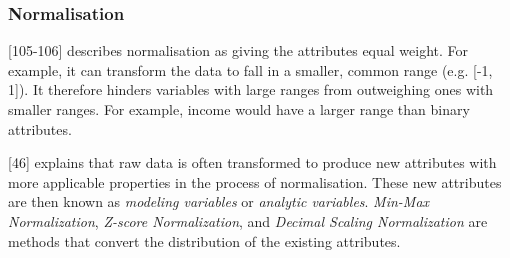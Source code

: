 


\subsubsection{Normalisation}



\textcite{han2011data}[105-106] describes normalisation as giving the attributes equal weight. For example, it can transform the data to fall in a smaller, common range (e.g. [-1, 1]). It therefore hinders variables with large ranges from outweighing ones with smaller ranges. For example, income would have a larger range than binary attributes. 

\textcite{dataPreprocessingInDataMining}[46] explains that raw data is often transformed to produce new attributes with more applicable properties in the process of normalisation. These new attributes are then known as \textit{modeling variables} or \textit{analytic variables}. \textit{Min-Max Normalization}, \textit{Z-score Normalization}, and \textit{Decimal Scaling Normalization} are methods that convert the distribution of the existing attributes.




